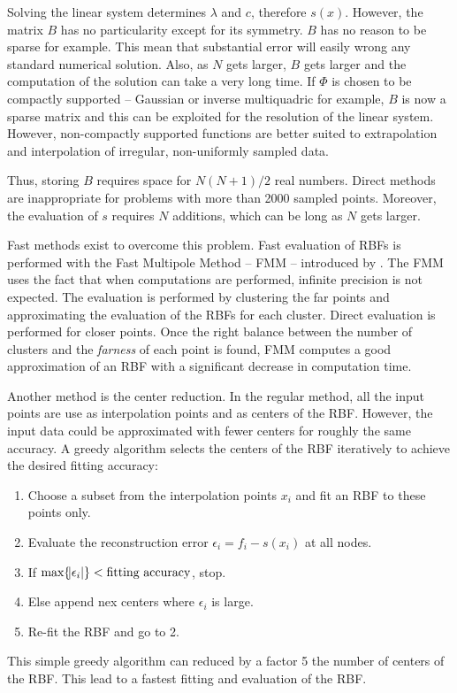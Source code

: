 \documentclass[12pt]{article}
\begin{document}
Solving the linear system determines $\lambda$ and $c$, therefore $s(x)$. However, the matrix $B$ has no particularity except for its symmetry. $B$ has no reason to be sparse for example. This mean that substantial error will easily wrong any standard numerical solution. Also, as $N$ gets larger, $B$ gets larger and the computation of the solution can take a very long time. If $\Phi$ is chosen to be compactly supported -- Gaussian or inverse multiquadric for example, $B$ is now a sparse matrix and this can be exploited for the resolution of the linear system. However, non-compactly supported functions are better suited to extrapolation and interpolation of irregular, non-uniformly sampled data.

Thus, storing $B$ requires space for $N(N+1)/2$ real numbers. Direct methods are inappropriate for problems with more than 2000 sampled points. Moreover, the evaluation of $s$ requires $N$ additions, which can be long as $N$ gets larger.

Fast methods exist to overcome this problem. Fast evaluation of RBFs is performed with the Fast Multipole Method -- FMM -- introduced by \cite{RBF2}. The FMM uses the fact that when computations are performed, infinite precision is not expected. The evaluation is performed by clustering the far points and approximating the evaluation of the RBFs for each cluster. Direct evaluation is performed for closer points. Once the right balance between the number of clusters and the \emph{farness} of each point is found, FMM computes a good approximation of an RBF with a significant decrease in computation time.

Another method is the center reduction. In the regular method, all the input points are use as interpolation points and as centers of the RBF. However, the input data could be approximated with fewer centers for roughly the same accuracy. A greedy algorithm selects the centers of the RBF iteratively to achieve the desired fitting accuracy:
\begin{enumerate}
\item Choose a subset from the interpolation points $x_i$ and fit an RBF to these points only.
\item Evaluate the reconstruction error $\epsilon_i = f_i - s(x_i)$ at all nodes.
\item If $\text{max}\{\abs{\epsilon_i}\} < \text{fitting accuracy}$, stop.
\item Else append nex centers where $\epsilon_i$ is large.
\item Re-fit the RBF and go to 2.
\end{enumerate}
This simple greedy algorithm can reduced by a factor 5 the number of centers of the RBF. This lead to a fastest fitting and evaluation of the RBF.
\end{document}
